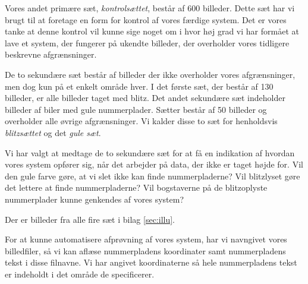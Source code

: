 Vores andet primære sæt, \textit{kontrolsættet}, består af 600 billeder. Dette sæt har vi brugt til at foretage en form for kontrol af vores færdige system. Det er vores tanke at denne kontrol vil kunne sige noget om i hvor høj grad vi har formået at lave et system, der fungerer på ukendte billeder, der overholder vores tidligere beskrevne afgrænsninger. 

De to sekundære sæt består af billeder der ikke overholder vores afgrænsninger, men dog kun på et enkelt område hver. I det første sæt, der består af 130 billeder, er alle billeder taget med blitz. Det andet sekundære sæt indeholder billeder af biler med gule nummerplader. Sætter består af 50 billeder og overholder alle øvrige afgrænsninger. Vi kalder disse to sæt for henholdsvis \textit{blitzsættet} og det \textit{gule sæt}.

Vi har valgt at medtage de to sekundære sæt for at få en indikation af hvordan vores system opfører sig, når det arbejder på data, der ikke er taget højde for. Vil den gule farve gøre, at vi slet ikke kan finde nummerpladerne? Vil blitzlyset gøre det lettere at finde nummerpladerne? Vil bogstaverne på de blitzoplyste nummerplader kunne genkendes af vores system?

Der er billeder fra alle fire sæt i bilag \vref{sec:illu}.

For at kunne automatisere afprøvning af vores system, har vi navngivet vores billedfiler, så vi kan aflæse nummerpladens koordinater samt nummerpladens tekst i disse filnavne. Vi har angivet koordinaterne så hele nummerpladens tekst er indeholdt i det område de specificerer.